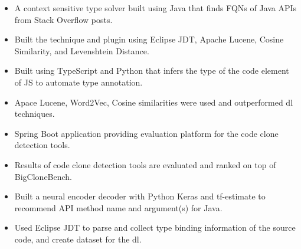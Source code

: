 \documentclass[10pt,a4paper,ragged2e,withhyper]{altacv}
\begin{document}
\begin{paracol}{2}
\begin{itemize}
\item A context sensitive type solver built using Java that finds FQNs of Java APIs from Stack Overflow posts.
\item Built the technique and plugin using Eclipse JDT, Apache Lucene, Cosine Similarity, and Levenshtein Distance.
\end{itemize}



\begin{itemize}
\item Built using TypeScript and Python that infers the type of the code element of JS to automate type annotation.
\item Apace Lucene, Word2Vec, Cosine similarities were used and outperformed dl techniques.
\end{itemize}

\begin{itemize}
\item Spring Boot application providing evaluation platform for the code clone detection tools.
\item Results of code clone detection tools are evaluated and ranked on top of BigCloneBench.
\end{itemize}


{}
\begin{itemize}
\item Built a neural encoder decoder with Python Keras and tf-estimate to recommend API method name and argument(s) for Java.
\item Used Eclipse JDT to parse and collect type binding information of the source code, and create dataset for the dl.
\end{itemize}



\end{paracol}
\end{document}
